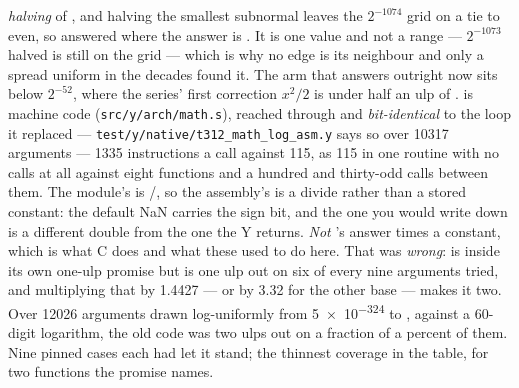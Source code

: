 \begin{description}[style=nextline,leftmargin=5.2em]
    \emph{halving} of , and halving the smallest subnormal leaves the
    $2^{-1074}$ grid on a tie to even, so  answered
     where the answer is . It is one value and not a range ---
    $2^{-1073}$ halved is still on the grid --- which is why no edge is its
    neighbour and only a spread uniform in the decades found it. The arm that
    answers  outright now sits below $2^{-52}$, where the series' first
    correction $x^2/2$ is under half an ulp of .
     is machine code (\texttt{src/y/arch/math.s}), reached through
     and \emph{bit-identical} to the loop it replaced ---
    \texttt{test/y/native/t312\_math\_log\_asm.y} says so over
    \num{10317} arguments --- \num{1335} instructions a call against \num{115},
    as \num{115} in one routine with no calls at all against eight functions
    and a hundred and thirty-odd calls between them. The module's  is
    /, so the assembly's is a divide rather than a stored
    constant: the default NaN carries the sign bit, and the one you would write
    down is a different double from the one the Y returns.
    \emph{Not} 's answer
    times a constant, which is what C does and what these used to do here. That
    was \emph{wrong}:  is inside its own one-ulp promise but is one
    ulp out on six of every nine arguments tried, and multiplying that by
    \num{1.4427} --- or by \num{3.32} for the other base --- makes it two. Over
    \num{12026} arguments drawn log-uniformly from \num{5e-324} to
    , against a \num{60}-digit logarithm, the old code was two ulps
    out on a fraction of a percent of them. Nine pinned cases each had let it
    stand; the thinnest coverage in the table, for two functions the promise names.


\end{description}

